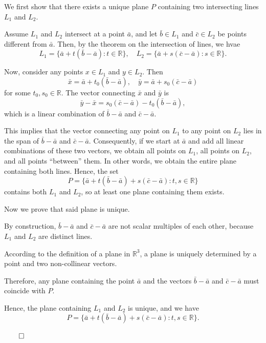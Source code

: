 \begin{proofbox}

We first show that there exists a unique plane \(P\) containing two intersecting lines \(L_1\) and \(L_2\).  

Assume \(L_1\) and \(L_2\) intersect at a point \(\bar{a}\), and let \(\bar{b} \in L_1\) and \(\bar{c} \in L_2\) be points different from \(\bar{a}\). Then, by the theorem on the intersection of lines, we hvae
\[
L_1 = \{\bar{a} + t(\bar{b}-\bar{a}) : t \in \mathbb{R}\}, \quad
L_2 = \{\bar{a} + s(\bar{c}-\bar{a}) : s \in \mathbb{R}\}.
\]

Now, consider any points \(x \in L_1\) and \(y \in L_2\). Then
\[
\bar{x} = \bar{a} + t_0(\bar{b}-\bar{a}), \quad \bar{y} = \bar{a} + s_0(\bar{c}-\bar{a})
\]
for some \(t_0, s_0 \in \mathbb{R}\). The vector connecting \(\bar{x}\) and \(\bar{y}\) is
\[
\bar{y} - \bar{x} = s_0(\bar{c}-\bar{a}) - t_0(\bar{b}-\bar{a}),
\]
which is a linear combination of \(\bar{b}-\bar{a}\) and \(\bar{c}-\bar{a}\). 

This implies that the vector connecting any point on \(L_1\) to any point on \(L_2\) lies in the span of \(\bar{b}-\bar{a}\) and \(\bar{c}-\bar{a}\). 
Consequently, if we start at \(\bar{a}\) and add all linear combinations of these two vectors, we obtain all points on \(L_1\), all points on \(L_2\), and all points “between” them. 
In other words, we obtain the entire plane containing both lines. Hence, the set
\[
P = \{\bar{a} + t(\bar{b}-\bar{a}) + s(\bar{c}-\bar{a}) : t, s \in \mathbb{R}\}
\]
contains both \(L_1\) and \(L_2\), so at least one plane containing them exists.

\vspace{1em}

Now we prove that said plane is unique.

By construction, \(\bar{b}-\bar{a}\) and \(\bar{c}-\bar{a}\) are not scalar multiples of each other, because \(L_1\) and \(L_2\) are distinct lines. 

According to the definition of a plane in \(\mathbb{R}^3\), a plane is uniquely determined by a point and two non-collinear vectors. 

Therefore, any plane containing the point \(\bar{a}\) and the vectors \(\bar{b}-\bar{a}\) and \(\bar{c}-\bar{a}\) must coincide with \(P\).  

Hence, the plane containing \(L_1\) and \(L_2\) is unique, and we have
\[
  P = \{\bar{a} + t(\bar{b}-\bar{a}) + s(\bar{c}-\bar{a}) : t, s \in \mathbb{R}\}.
\]

\hfill $\qed$

\end{proofbox}

